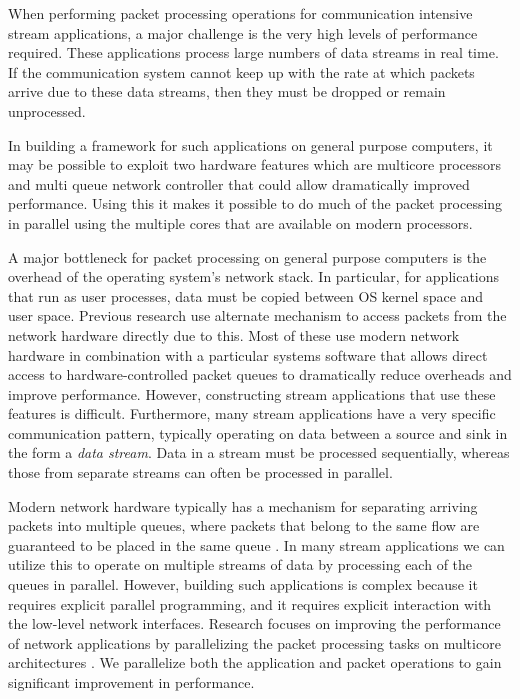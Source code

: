 \documentclass[conference]{IEEEtran}
\begin{document}
When performing packet processing operations for communication intensive stream applications, a major challenge is the very high levels of performance required. These applications process large numbers of data streams in real time.  If the communication system cannot keep up with the rate at which packets arrive due to these data streams, then they must be dropped or remain unprocessed. 

In building a framework for such applications on general purpose computers, it may be possible to exploit two hardware features which are multicore processors and multi queue network controller that could allow dramatically improved performance. Using this it makes it possible to do much of the packet processing in parallel using the multiple cores that are available on modern processors.  

A major bottleneck for packet processing on general purpose computers is the overhead of the operating system's network stack. In particular, for applications that run as user processes, data must be copied between OS kernel space and user space. Previous research use alternate mechanism to access packets from the network hardware directly due to this\cite{Dobrescu09routebricks:exploiting}\cite{Han:2010:PGS:1851275.1851207}\cite{Kohler2000}. Most of these use modern network hardware in combination with a particular systems software that allows direct access to hardware-controlled packet queues to dramatically reduce overheads and improve performance. However, constructing stream applications that use these features is difficult. Furthermore, many stream applications have a very specific communication pattern, typically operating on data between a source and sink in the form a \textit{data stream}. Data in a stream must be processed sequentially, whereas those from separate streams can often be processed in parallel.

Modern network hardware typically has a mechanism for separating arriving packets into multiple queues, where packets that belong to the same flow are guaranteed to be placed in the same queue\cite{micro2008} \cite{intel2010}. In many stream applications we can utilize this to operate on multiple streams of data by processing each of the queues in parallel. However, building such applications is complex because it requires explicit parallel programming, and it requires explicit interaction with the low-level network interfaces. Research focuses on improving the performance of network applications by parallelizing the packet processing tasks on multicore architectures \cite{Dobrescu09routebricks:exploiting} \cite{Han:2010:PGS:1851275.1851207}. We parallelize both the application and packet operations to gain significant improvement in performance.
\end{document}
